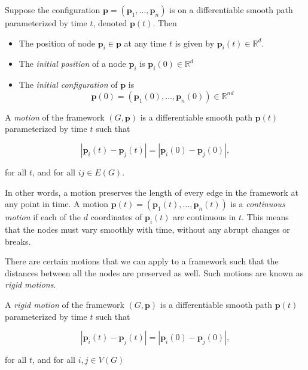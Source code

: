 \begin{definition}
Suppose the configuration $\mathbf{p} = (\mathbf{p}_1, \hdots, \mathbf{p}_n)$ is on a differentiable smooth path parameterized by time $t$, denoted $\mathbf{p}(t)$. Then 

    \begin{itemize}
        \item The position of node $\mathbf{p}_i \in \mathbf{p}$ at any time $t$ is given by $\mathbf{p}_i(t) \in \mathbb{R}^d$.
        \vspace{-3mm}
        \item The \textit{initial position} of a node $\mathbf{p}_i$ is $\mathbf{p}_i(0) \in \mathbb{R}^d$
        \vspace{-3mm}
        \item The \textit{initial configuration} of $\mathbf{p}$ is 
        \[
        \mathbf{p}(0) = (\mathbf{p}_1(0), \hdots, \mathbf{p}_n(0)) \in \mathbb{R}^{nd}
        \]
    \end{itemize}
\end{definition}

\begin{definition}
A \textit{motion} of the framework $(G,\mathbf{p})$ is a differentiable smooth path $\mathbf{p}(t)$ parameterized by time $t$ such that 

\[
|\mathbf{p}_i(t) - \mathbf{p}_j(t)| = |\mathbf{p}_i(0) - \mathbf{p}_j(0)|,
\]

\noindent
for all $t$, and for all $ij \in E(G)$.
\end{definition}

\begin{flushleft}
In other words, a motion preserves the length of every edge in the framework at any point in time. A motion $\mathbf{p}(t) = (\mathbf{p}_1(t), \hdots, \mathbf{p}_n(t))$ is a \textit{continuous motion} if each of the $d$ coordinates of $\mathbf{p}_i(t)$ are continuous in $t$. This means that the nodes must vary smoothly with time, without any abrupt changes or breaks.
\end{flushleft}

\begin{flushleft}
There are certain motions that we can apply to a framework such that the distances between all the nodes are preserved as well. Such motions are known as \textit{rigid motions}.
\end{flushleft}

\begin{definition}
A \textit{rigid motion} of the framework $(G,\mathbf{p})$ is a differentiable smooth path $\mathbf{p}(t)$ parameterized by time $t$ such that 

\[
|\mathbf{p}_i(t) - \mathbf{p}_j(t)| = |\mathbf{p}_i(0) - \mathbf{p}_j(0)|,
\]

\noindent
for all $t$, and for all $i, j \in V(G)$
\end{definition}

